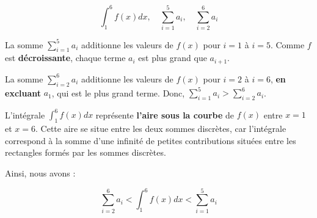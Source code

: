 \documentclass{report}
\begin{document}
    \[
    \int_{1}^{6} f(x) dx, \quad \sum_{i=1}^{5} a_i, \quad \sum_{i=2}^{6} a_i
    \]

    La somme $\sum_{i=1}^{5} a_i$ additionne les valeurs de $f(x)$ pour 
    $i = 1$ à $i = 5$. Comme $f$ est \textbf{décroissante}, chaque terme $a_i$ est plus 
    grand que $a_{i+1}$.
    \vspace{1em}

    La somme $\sum_{i=2}^{6} a_i$ additionne les valeurs de $f(x)$ pour 
    $i = 2$ à $i = 6$, \textbf{en excluant} $a_1$, qui est le plus grand terme. Donc, 
    $\sum_{i=1}^{5} a_i > \sum_{i=2}^{6} a_i$.
    \vspace{1em}

    L'intégrale $\int_{1}^{6} f(x) dx$ représente \textbf{l'aire sous la courbe }   
    de $f(x)$ entre $x = 1$ et $x = 6$. Cette aire se situe entre les deux 
    sommes discrètes, car l'intégrale correspond à la somme d'une infinité 
    de petites contributions situées entre les rectangles formés par les 
    sommes discrètes.

    \noindent
    Ainsi, nous avons :

    \[
        \boxed{\sum_{i=2}^{6} a_i < \int_{1}^{6} f(x) dx < \sum_{i=1}^{5} a_i}
    \]
\end{document}
